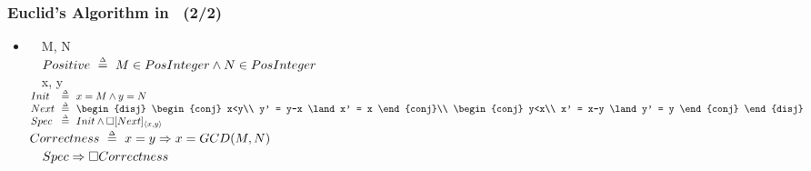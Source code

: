 \begin{frame}
  \frametitle{Euclid's Algorithm in \tlaplus\ (2/2)}

  \begin{itemize}
  \item {}

    \medskip

    \begin{tlablock}
      \begin{minipage}{.96\linewidth}
      \begin{nomodule}
        \CONSTANTS\ \ M, N\\
        \ASSUME\ \ $Positive\ \mathrel{\smash{\stackrel{\scriptscriptstyle\Delta}{=}}}\ M \in PosInteger \land N \in PosInteger$\\
        \VARIABLES\ \ x, y\\[1mm]
        \(\begin{array}{@{}l@{\ \ }c@{\ \ }l}
          Init & \deq & x=M \land y=N\\
          Next & \deq &
          \begin{disj}
            \begin{conj}
              x<y\\
              y' = y-x \land x' = x
            \end{conj}\\
            \begin{conj}
              y<x\\
              x' = x-y \land y' = y
            \end{conj}
          \end{disj}\\
          Spec & \deq & Init \land \alw[Next]_{\seq{x,y}}
        \end{array}\)\\
        \midbar
        $Correctness\ \mathrel{\smash{\stackrel{\scriptscriptstyle\Delta}{=}}}\ x=y \Rightarrow x = GCD(M,N)$\\[1mm]
        \THEOREM\ \ $Spec \Rightarrow \Box Correctness$\\
        \bottombar
      \end{nomodule}
      \end{minipage}
    \end{tlablock}


  \oo {}

  \oo {}
  \end{itemize}
\end{frame}

